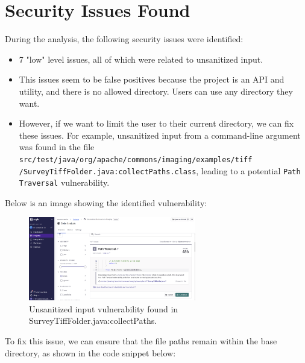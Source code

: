 \documentclass[a4paper,12pt]{report}
\begin{document}
\section{Security Issues Found}
During the analysis, the following security issues were identified:
\begin{itemize}
    \item 7 "low" level issues, all of which were related to unsanitized input.
    \item This issues seem to be false positives because the project is an API and utility, and there is no allowed directory. Users can use any directory they want.
    \item However, if we want to limit the user to their current directory, we can fix these issues. For example, unsanitized input from a command-line argument was found in the file \texttt{src/test/java/org/apache/commons/imaging/examples/tiff \\ /SurveyTiffFolder.java:collectPaths.class}, leading to a potential \texttt{Path Traversal} vulnerability.
\end{itemize}

Below is an image showing the identified vulnerability:

\begin{figure}[H]
    \centering
    \includegraphics[width=0.65\textwidth]{Report_Img/synk_input_issue.png}
    \caption{Unsanitized input vulnerability found in SurveyTiffFolder.java:collectPaths.}
    \label{fig:unsanitized-input}
\end{figure}

To fix this issue, we can ensure that the file paths remain within the base directory, as shown in the code snippet below:
\end{document}
